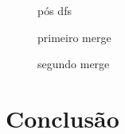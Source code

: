 \documentclass[12pt]{article}
\begin{document}
\begin{figure}[h!]
	\begin{minipage}[b]{0.5\textwidth}
		\resizebox{\textwidth}{!}
		{
			
		}
	    \caption{pós dfs}
  	\end{minipage}
  	\hfill
	\begin{minipage}[b]{0.5\textwidth}
		\resizebox{\textwidth}{!}
		{
			
		}
	    \caption{primeiro merge}
  	\end{minipage}
\end{figure}

\begin{figure}[h!]
	\centering
	\begin{minipage}[b]{0.5\textwidth}
		\resizebox{\textwidth}{!}
		{
			
		}
	    \caption{segundo merge}
  	\end{minipage}
\end{figure}

{\color{gray}\lipsum[1]}

\section{Conclusão}

{\color{gray}\lipsum[1]}



\end{document}
